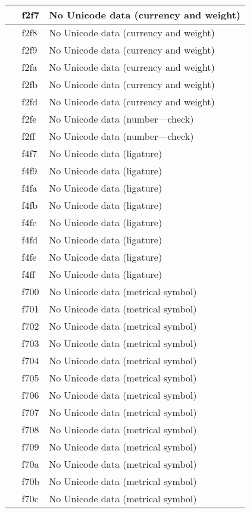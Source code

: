 \documentclass[12pt,letterpaper,openany]{book}
\begin{document}
\begin{center}
\begin{supertabular}{|m{0.25in}|m{0.5in}|m{4in}|}
 & f2f7 & No Unicode data (currency and weight)\\\hline
 & f2f8 & No Unicode data (currency and weight)\\\hline
 & f2f9 & No Unicode data (currency and weight)\\\hline
 & f2fa & No Unicode data (currency and weight)\\\hline
 & f2fb & No Unicode data (currency and weight)\\\hline
 & f2fd & No Unicode data (currency and weight)\\\hline
 & f2fe & No Unicode data (number---check)\\\hline
 & f2ff & No Unicode data (number---check)\\\hline
 & f4f7 & No Unicode data (ligature)\\\hline
 & f4f9 & No Unicode data (ligature)\\\hline
 & f4fa & No Unicode data (ligature)\\\hline
 & f4fb & No Unicode data (ligature)\\\hline
 & f4fc & No Unicode data (ligature)\\\hline
 & f4fd & No Unicode data (ligature)\\\hline
 & f4fe & No Unicode data (ligature)\\\hline
 & f4ff & No Unicode data (ligature)\\\hline
 & f700 & No Unicode data (metrical symbol)\\\hline
 & f701 & No Unicode data (metrical symbol)\\\hline
 & f702 & No Unicode data (metrical symbol)\\\hline
 & f703 & No Unicode data (metrical symbol)\\\hline
 & f704 & No Unicode data (metrical symbol)\\\hline
 & f705 & No Unicode data (metrical symbol)\\\hline
 & f706 & No Unicode data (metrical symbol)\\\hline
 & f707 & No Unicode data (metrical symbol)\\\hline
 & f708 & No Unicode data (metrical symbol)\\\hline
 & f709 & No Unicode data (metrical symbol)\\\hline
 & f70a & No Unicode data (metrical symbol)\\\hline
 & f70b & No Unicode data (metrical symbol)\\\hline
 & f70c & No Unicode data (metrical symbol)\\\hline

\end{supertabular}
\end{center}
\end{document}

